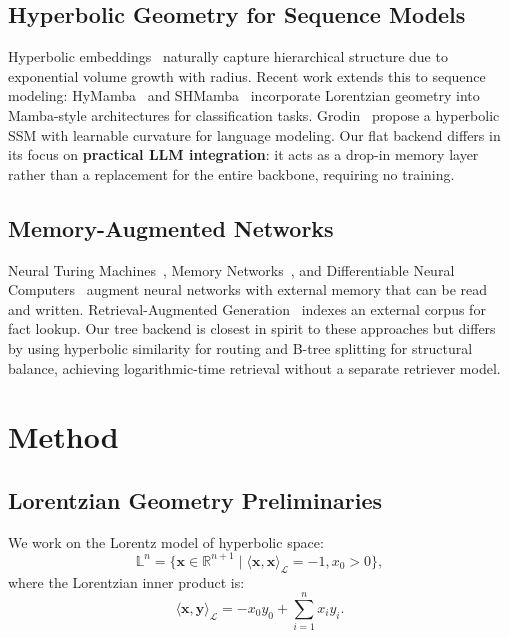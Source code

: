 \documentclass[conference]{IEEEtran}
\begin{document}
\subsection{Hyperbolic Geometry for Sequence Models}

Hyperbolic embeddings~\cite{nickel2017poincare} naturally capture hierarchical structure due to exponential volume growth with radius. Recent work extends this to sequence modeling: HyMamba~\cite{choi2024hymamba} and SHMamba~\cite{shimizu2025shmamba} incorporate Lorentzian geometry into Mamba-style architectures for classification tasks. Grodin~\cite{grodin2025hyperbolic} propose a hyperbolic SSM with learnable curvature for language modeling. Our flat backend differs in its focus on \textbf{practical LLM integration}: it acts as a drop-in memory layer rather than a replacement for the entire backbone, requiring no training.

\subsection{Memory-Augmented Networks}

Neural Turing Machines~\cite{graves2014neural}, Memory Networks~\cite{weston2014memory}, and Differentiable Neural Computers~\cite{sukhbaatar2015end} augment neural networks with external memory that can be read and written. Retrieval-Augmented Generation~\cite{lewis2020retrieval, borgeaud2022improving} indexes an external corpus for fact lookup. Our tree backend is closest in spirit to these approaches but differs by using hyperbolic similarity for routing and B-tree splitting for structural balance, achieving logarithmic-time retrieval without a separate retriever model.

\section{Method}

\subsection{Lorentzian Geometry Preliminaries}

We work on the Lorentz model of hyperbolic space:
\begin{equation}
\mathbb{L}^n = \{\mathbf{x} \in \mathbb{R}^{n+1} \mid \langle \mathbf{x}, \mathbf{x} \rangle_{\mathcal{L}} = -1, x_0 > 0\},
\label{eq:lorentz}
\end{equation}
where the Lorentzian inner product is:
\begin{equation}
\langle \mathbf{x}, \mathbf{y} \rangle_{\mathcal{L}} = -x_0 y_0 + \sum_{i=1}^n x_i y_i.
\label{eq:lorentz-inner}
\end{equation}
\end{document}
